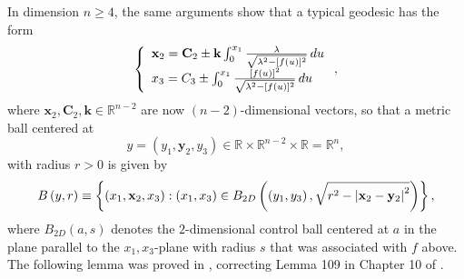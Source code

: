 \documentclass{amsart}
\theoremstyle{plain}
\numberwithin{equation}{section}
\begin{document}
In dimension $n\geq 4$, the same arguments show that a typical geodesic has
the form 
\begin{equation*}
\left\{ 
\begin{array}{l}
\mathbf{x}_{2}=\mathbf{C}_{2}\pm \mathbf{k}\int_{0}^{x_{1}}\frac{\lambda }{%
	\sqrt{\lambda ^{2}-[f(u)]^{2}}}\,du \\ 
x_{3}=C_{3}\pm \int_{0}^{x_{1}}\frac{[f(u)]^{2}}{\sqrt{\lambda
		^{2}-[f(u)]^{2}}}\,du%
\end{array}%
\right. ,
\end{equation*}%
where $\mathbf{x}_{2},\mathbf{C}_{2},\mathbf{k}\in \mathbb{R}^{n-2}$ are now 
$\left( n-2\right) $-dimensional vectors, so that a metric ball centered at 
\begin{equation*}
y=\left( y_{1},\mathbf{y}_{2},y_{3}\right) \in \mathbb{R}\times \mathbb{R}%
^{n-2}\times \mathbb{R}=\mathbb{R}^{n},
\end{equation*}%
with radius $r>0$ is given by 
\begin{equation*}
B\left( y,r\right) \equiv \left\{ \left( x_{1},\mathbf{x}_{2},x_{3}\right)
:\left( x_{1},x_{3}\right) \in B_{2D}\left( \left( y_{1},y_{3}\right) ,\sqrt{%
	r^{2}-\left\vert \mathbf{x}_{2}-\mathbf{y}_{2}\right\vert ^{2}}\right)
\right\} ,
\end{equation*}%
where $B_{2D}\left( a,s\right) $ denotes the $2$-dimensional control ball
centered at $a$ in the plane parallel to the $x_{1},x_{3}$-plane with radius 
$s$ that was associated with $f$ above. The following lemma was proved in 
\cite{KoRiSaSh2}, correcting Lemma 109 in Chapter 10 of \cite{KoRiSaSh1}.
\end{document}
